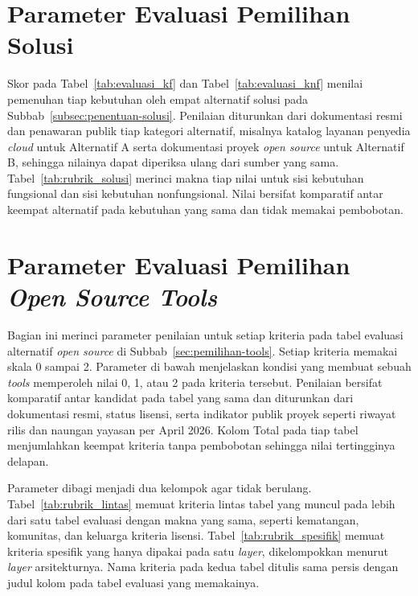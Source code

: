 \section{Parameter Evaluasi Pemilihan Solusi}
\label{sec:appx-rubrik-solusi}

Skor pada Tabel~\ref{tab:evaluasi_kf} dan Tabel~\ref{tab:evaluasi_knf} menilai pemenuhan tiap kebutuhan oleh empat alternatif solusi pada Subbab~\ref{subsec:penentuan-solusi}. Penilaian diturunkan dari dokumentasi resmi dan penawaran publik tiap kategori alternatif, misalnya katalog layanan penyedia \textit{cloud} untuk Alternatif A serta dokumentasi proyek \textit{open source} untuk Alternatif B, sehingga nilainya dapat diperiksa ulang dari sumber yang sama. Tabel~\ref{tab:rubrik_solusi} merinci makna tiap nilai untuk sisi kebutuhan fungsional dan sisi kebutuhan nonfungsional. Nilai bersifat komparatif antar keempat alternatif pada kebutuhan yang sama dan tidak memakai pembobotan.



\section{Parameter Evaluasi Pemilihan \textit{Open Source Tools}}
\label{sec:appx-rubrik-tools}

Bagian ini merinci parameter penilaian untuk setiap kriteria pada tabel evaluasi alternatif \textit{open source} di Subbab~\ref{sec:pemilihan-tools}. Setiap kriteria memakai skala 0 sampai 2. Parameter di bawah menjelaskan kondisi yang membuat sebuah \textit{tools} memperoleh nilai 0, 1, atau 2 pada kriteria tersebut. Penilaian bersifat komparatif antar kandidat pada tabel yang sama dan diturunkan dari dokumentasi resmi, status lisensi, serta indikator publik proyek seperti riwayat rilis dan naungan yayasan per April 2026. Kolom Total pada tiap tabel menjumlahkan keempat kriteria tanpa pembobotan sehingga nilai tertingginya delapan.

Parameter dibagi menjadi dua kelompok agar tidak berulang. Tabel~\ref{tab:rubrik_lintas} memuat kriteria lintas tabel yang muncul pada lebih dari satu tabel evaluasi dengan makna yang sama, seperti kematangan, komunitas, dan keluarga kriteria lisensi. Tabel~\ref{tab:rubrik_spesifik} memuat kriteria spesifik yang hanya dipakai pada satu \textit{layer}, dikelompokkan menurut \textit{layer} arsitekturnya. Nama kriteria pada kedua tabel ditulis sama persis dengan judul kolom pada tabel evaluasi yang memakainya.

